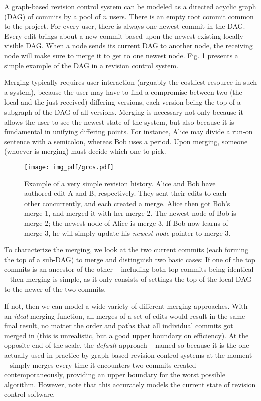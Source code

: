 \documentclass[conference,letterpaper]{IEEEtran}
\begin{document}
A graph-based revision control system can be modeled as a directed acyclic graph (DAG) of commits by a pool of $n$ users. There is an empty root commit common to the project. For every user, there is always one newest commit in the DAG. Every edit brings about a new commit based upon the newest existing locally visible DAG. When a node sends its current DAG to another node, the receiving node will make sure to merge it to get to one newest node. Fig. \ref{fig:grcs} presents a simple example of the DAG in a revision control system.

Merging typically requires user interaction (arguably the costliest resource in such a system), because the user may have to find a compromise between two (the local and the just-received) differing versions, each version being the top of a subgraph of the DAG of all versions. Merging is necessary not only because it allows the user to see the newest state of the system, but also because it is fundamental in unifying differing points. For instance, Alice may divide a run-on sentence with a semicolon, whereas Bob uses a period. Upon merging, someone (whoever is merging) must decide which one to pick.

\begin{figure}
  \texttt{[image: img\_pdf/grcs.pdf]}
  \caption{Example of a very simple revision history. Alice and Bob have authored edit A and B, respectively. They sent their edits to each other concurrently, and each created a merge. Alice then got Bob's merge 1, and merged it with her merge 2. The newest node of Bob is merge 2; the newest node of Alice is merge 3. If Bob now learns of merge 3, he will simply update his \textit{newest node} pointer to merge 3.}
  \label{fig:grcs}
\end{figure}

To characterize the merging, we look at the two current commits (each forming the top of a sub-DAG) to merge and distinguish two basic cases: If one of the top commits is an ancestor of the other -- including both top commits being identical -- then merging is simple, as it only consists of settings the top of the local DAG to the newer of the two commits.

If not, then we can model a wide variety of different merging approaches. With an \textit{ideal} merging function, all merges of a set of edits would result in the same final result, no matter the order and paths that all individual commits got merged in (this is unrealistic, but a good upper boundary on efficiency). At the opposite end of the scale, the \textit{default} approach -- named so because it is the one actually used in practice by graph-based revision control systems at the moment -- simply merges every time it encounters two commits created contemporaneously, providing an upper boundary for the worst possible algorithm. However, note that this accurately models the current state of revision control software.
\end{document}
